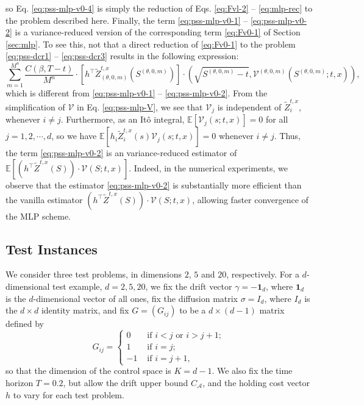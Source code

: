 \documentclass[11pt]{article}
\theoremstyle{definition}
\theoremstyle{plain}
\newcommand{\E}{\mathbb{E}}
\newcommand{\bOne}{\bm{1}}
\begin{document}
so Eq. \eqref{eq:pss-mlp-v0-4} is simply the reduction of Eqs. \eqref{eq:Fvl-2} -- \eqref{eq:mlp-rec} to the problem described here. 
Finally, the term \eqref{eq:pss-mlp-v0-1} -- \eqref{eq:pss-mlp-v0-2} is a variance-reduced version of the corresponding term \eqref{eq:Fv0-1} of Section \ref{sec:mlp}. 
To see this, not that a direct reduction of \eqref{eq:Fv0-1} to the problem \eqref{eq:pss-dcr1} -- \eqref{eq:pss-dcr3} results in the following expression: 
\[
  \sum_{m=1}^{M^n} \frac{C(\beta, T-t)}{M^n} \cdot \left[h^\top \tilde Z^{t,x}_{(\theta, 0, m)} \left(S^{(\theta, 0, m)}\right)\right] \cdot \left(\sqrt{S^{(\theta,0,m)}-t}, \mathcal{V}^{(\theta,0,m)}\left(S^{(\theta, 0, m)}; t,x\right)\right),
\]
which is different from \eqref{eq:pss-mlp-v0-1} -- \eqref{eq:pss-mlp-v0-2}. 
From the simplification of $\mathcal{V}$ in Eq. \eqref{eq:pss-mlp-V}, we see that $\mathcal{V}_j$ 
is independent of $\tilde Z_i^{t,x}$, whenever $i \neq j$. 
Furthermore, as an Itô integral, $\E[\mathcal{V}_j(s; t,x)] = 0$ for all $j = 1, 2, \cdots, d$, 
so we have 
$\E\left[h_i \tilde Z_i^{t,x}(s) \mathcal{V}_j(s; t,x)\right] = 0$ whenever $i \neq j$.
Thus, the term \eqref{eq:pss-mlp-v0-2} is an variance-reduced estimator of 
\(
\E\left[\left(h^\top \tilde Z^{t,x}(S) \right) \cdot \mathcal{V}(S; t,x)\right].
\)
Indeed, in the numerical experiments, we observe that the estimator \eqref{eq:pss-mlp-v0-2} is substantially more efficient 
than the vanilla estimator $\left(h^\top \tilde Z^{t,x}(S) \right) \cdot \mathcal{V}(S; t,x)$, allowing faster convergence of the MLP scheme.


\subsection{Test Instances}\label{ssec:test-instances}

We consider three test problems, in dimensions $2$, $5$ and $20$, respectively. 
For a $d$-dimensional test example, $d=2, 5, 20$, we fix the drift vector $\gamma = -\bOne_d$, 
where $\bOne_d$ is the $d$-dimensional vector of all ones, 
fix the diffusion matrix $\sigma = I_d$, where $I_d$ is the $d\times d$ identity matrix, 
and fix $G = (G_{ij})$ to be a $d\times (d-1)$ matrix defined by
\begin{equation}\label{eq:G}
G_{ij} = \left\{\begin{array}{ll}
    0 & \text{ if } i<j \text{ or } i>j+1; \\
    1 & \text{ if } i=j; \\
    -1 & \text{ if } i=j+1,
\end{array}
    \right.
\end{equation}
so that the dimension of the control space is $K = d-1$.
We also fix the time horizon $T = 0.2$, but allow the drift upper bound $C_{\mathcal{A}}$, and the holding cost vector $h$ to vary 
for each test problem. 
\end{document}
